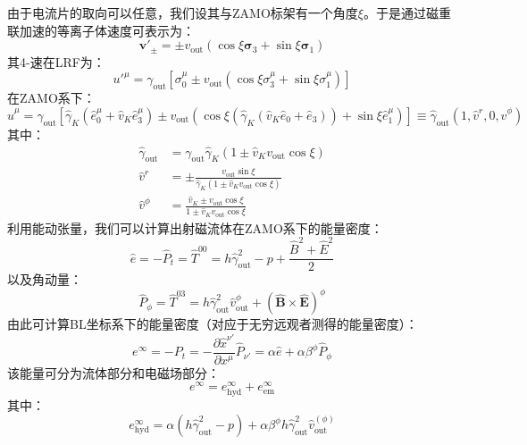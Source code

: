 \documentclass[lang=cn,color=blue,cm,11pt,scheme=chinese,bibend=bibtex,sorting=nty]{elegantbook}
\begin{document}
	由于电流片的取向可以任意，我们设其与ZAMO标架有一个角度$\xi$。于是通过磁重联加速的等离子体速度可表示为：
	\begin{equation}
		\bm{v}'_{\pm} = \pm v_{\text{out}} (\cos \xi \bm{\sigma}_3 + \sin \xi \bm{\sigma}_1)
	\end{equation}
	其4-速在LRF为：
	\begin{equation}
		{u'}^{\mu} = \gamma_{\text{out}} [\sigma_0^{\mu} \pm v_{\text{out}} (\cos \xi \sigma^{\mu}_3 + \sin \xi \sigma^{\mu}_1)]
	\end{equation}
	在ZAMO系下：
	\begin{equation}
		\hat{u}^{\mu} = \gamma_{\text{out}} [\hat{\gamma}_K (\hat{e}_0^{\mu} + \hat{v}_K \hat{e}_3^{\mu}) \pm v_{\text{out}} (\cos \xi (\hat{\gamma}_K (\hat{v}_K  \hat{e}_0 + \hat{e}_3)) + \sin \xi \hat{e}_1^{\mu})] \equiv \hat{\gamma}_{\text{out}} (1, \hat{v}^r, 0, \hat{v}^{\phi})
	\end{equation}
	其中：
	\begin{align}
		\hat{\gamma}_{\text{out}} &= \gamma_{\text{out}} \hat{\gamma}_K (1 \pm \hat{v}_K v_{\text{out}} \cos \xi) \\
		\hat{v}^r &= \pm \frac{v_{\text{out}} \sin \xi}{\hat{\gamma}_K (1 \pm \hat{v}_K v_{\text{out}} \cos \xi)} \\
		\hat{v}^{\phi} &= \frac{\hat{v}_K \pm v_{\text{out}} \cos \xi}{1 \pm \hat{v}_K v_{\text{out}} \cos \xi}
	\end{align}
	利用能动张量，我们可以计算出射磁流体在ZAMO系下的能量密度：
	\begin{equation}
		\hat{e} = - \hat{P}_t = \hat{T}^{00} = h \hat{\gamma}_{\text{out}}^2 - p + \frac{\hat{B}^2 + \hat{E}^2}{2}
	\end{equation}
	以及角动量：
	\begin{equation}
		\hat{P}_{\phi} = \hat{T}^{03} = h \hat{\gamma}^2_{\text{out}} \hat{v}^{\phi}_{\text{out}} + (\hat{\bm{B}} \times \hat{\bm{E}})^{\phi}
	\end{equation}
	由此可计算BL坐标系下的能量密度（对应于无穷远观者测得的能量密度）：
	\begin{equation}
		e^{\infty} = - P_t = - \frac{\partial \hat{x}^{\nu'}}{\partial x^{\mu}} \hat{P}_{\nu'} = \alpha \hat{e} + \alpha \beta^{\phi} \hat{P}_{\phi}
	\end{equation}
	该能量可分为流体部分和电磁场部分：
	\begin{equation}
		e^{\infty} = e^{\infty}_{\text{hyd}} + e^{\infty}_{\text{em}}
	\end{equation}
	其中：
	\begin{equation}
		e^{\infty}_{\text{hyd}} = \alpha (h \hat{\gamma}_{\text{out}}^2 - p) + \alpha \beta^{\phi} h \hat{\gamma}_{\text{out}}^2 \hat{v}^{(\phi)}_{\text{out}}
	\end{equation}
\end{document}
